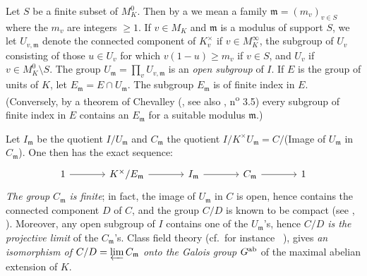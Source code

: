 Let $S$ be a finite subset of $M_K^0$.
\dpage
Then by a  we mean a family $\mathfrak{m} =
(m_v)_{v\in S}$ where the $m_v$ are integers $\ge 1$.  If $v \in M_K$ and
$\mathfrak{m}$ is a modulus of support $S$, we let $U_{v, \mathfrak{m}}$%
 denote the connected component of
$K_v^\times$ if $v \in M_K^\infty$, the subgroup of $U_v$ consisting of those
$u \in U_v$ for which $v(1-u) \ge m_v$ if $v \in S$, and $U_v$ if $v \in M_K^0
\setminus S$. The group $U_{\mathfrak{m}} = \prod_{v} U_{v, \mathfrak{m}}$ is
an \emph{open subgroup} of $I$.  If $E$ is the group of units of $K$, let
$E_{\mathfrak{m}} = E \cap U_{\mathfrak{m}}$. The
subgroup $E_{\mathfrak{m}}$ is of finite index in $E$.
(Conversely, by a theorem of Chevalley (\cite{8}, see also \cite{24},
n\textsuperscript{o} 3.5) every subgroup of finite index in $E$ contains an
$E_{\mathfrak{m}}$ for a suitable modulus $\mathfrak{m}$.)

Let $I_{\mathfrak{m}}$ be the quotient
$I/U_{\mathfrak{m}}$ and $C_{\mathfrak{m}}$ the
quotient $I/K^\times U_{\mathfrak{m}} = C/$(Image of $U_{\mathfrak{m}}$ in
$C_{\mathfrak{m}}$). One then has the exact sequence:
\[\begin{tikzcd}[sep=large]
	1 \rar & K^\times/E_{\mathfrak{m}} \rar & I_{\mathfrak{m}} \rar &
	C_{\mathfrak{m}} \rar & 1
\end{tikzcd}\]
\emph{The group $C_{\mathfrak{m}}$ is finite}; in fact, the image of
$U_{\mathfrak{m}}$ in $C$ is open, hence contains the connected component
$D$ of $C$, and the group $C/D$ is known to be compact (see
\cite{13}, \cite{44}).  Moreover, any open subgroup of $I$ contains one of the
$U_{\mathfrak{m}}$'s, hence \emph{$C/D$ is the projective limit} of the
$C_{\mathfrak{m}}$'s. Class field theory (cf.\ for instance
\citeauthor{6}~\cite{6}), gives \emph{an isomorphism of $C/D = \varprojlim
C_{\mathfrak{m}}$ onto the Galois group $G^{\mathrm{ab}}$} of the maximal abelian
extension of $K$.


